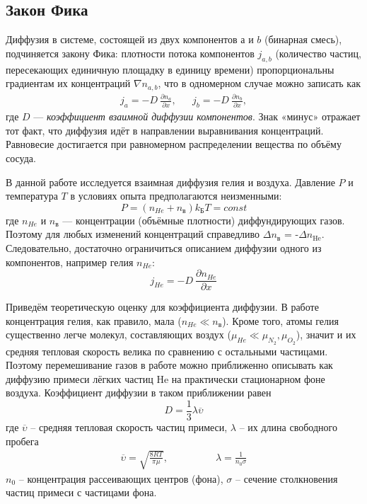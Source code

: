 \documentclass[a4paper,12pt]{article}
\theoremstyle{plain} %
\theoremstyle{definition} %
\theoremstyle{remark} %
\begin{document}
	\subsection{Закон Фика}
	Диффузия в системе, состоящей из двух компонентов $а$ и $b$ (бинарная смесь), подчиняется закону Фика: плотности потока компонентов 
	$j_{a,b}$ (количество частиц, пересекающих единичную площадку в единицу времени) пропорциональны градиентам их концентраций $\nabla n_{a, b}$, что в одномерном случае можно записать как
\begin{equation*}
\begin{aligned}
j_a = -D\ \frac{\partial  n_a}{\partial  x}, &  & j_b = -D \ \frac{\partial n_b}{\partial x},
\end{aligned}
\end{equation*}
где $D$ — \textit{коэффициент взаимной диффузии компонентов}. Знак «минус» отражает тот факт, что диффузия идёт в направлении выравнивания концентраций. Равновесие достигается при равномерном распределении вещества по объёму сосуда.

В данной работе исследуется взаимная диффузия гелия и воздуха. Давление $P$ и температура $T$ в условиях опыта предполагаются неизменными: 
\[P = (n_{He}+n_\text{в})k_\text{Б} T = const\]
где $n_{He}$ и $n_\text{в}$ — концентрации (объёмные плотности) диффундирующих газов. Поэтому для любых изменений концентраций справедливо $\Delta n_\text{в}$ = -$\Delta n_\text{He}$. Следовательно, достаточно ограничиться описанием диффузии одного из компонентов, например гелия $n_{He}$:
\begin{equation}
j_{He} = -D\ \frac{\partial n_{He}}{\partial x}
\end{equation}

Приведём теоретическую оценку для коэффициента диффузии. В работе концентрация гелия, как правило, мала ($n_{He} \ll n_\text{в}$). Кроме того, атомы гелия
существенно легче молекул, составляющих воздух ($\mu_{He} \ll \mu_{N_2} , \mu_{O_2}$), значит
и их средняя тепловая скорость велика по сравнению с остальными частицами. Поэтому перемешивание газов в работе можно приближенно описывать как диффузию примеси лёгких частиц He на практически стационарном фоне воздуха. Коэффициент диффузии в таком приближении равен
\begin{equation}
D = \frac{1}{3}\lambda \overline{\upsilon} 
\end{equation}
где $\overline{\upsilon}$ -- средняя тепловая скорость частиц примеси, $\lambda$ -- их длина свободного пробега
\begin{equation*}
\begin{aligned}
\overline{\upsilon} = \sqrt{\frac{8RT}{\pi \mu}}, & & & & & & \lambda = \frac{1}{n_0 \sigma}
\end{aligned}
\end{equation*}
$n_0$ -- концентрация рассеивающих центров (фона), $\sigma$ -- сечение столкновения частиц примеси с частицами фона.
\end{document}
